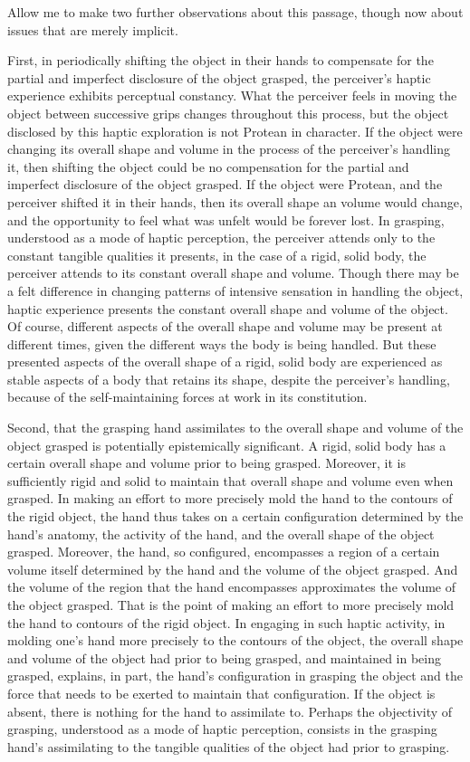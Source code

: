 \documentclass[12pt]{article}
\begin{document}
Allow me to make two further observations about this passage, though now about issues that are merely implicit.

First, in periodically shifting the object in their hands to compensate for the partial and imperfect disclosure of the object grasped, the perceiver's haptic experience exhibits perceptual constancy. What the perceiver feels in moving the object between successive grips changes throughout this process, but the object disclosed by this haptic exploration is not Protean in character. If the object were changing its overall shape and volume in the process of the perceiver's handling it, then shifting the object could be no compensation for the partial and imperfect disclosure of the object grasped. If the object were Protean, and the perceiver shifted it in their hands, then its overall shape an volume would change, and the opportunity to feel what was unfelt would be forever lost. In grasping, understood as a mode of haptic perception, the perceiver attends only to the constant tangible qualities it presents, in the case of a rigid, solid body, the perceiver attends to its constant overall shape and volume. Though there may be a felt difference in changing patterns of intensive sensation in handling the object, haptic experience presents the constant overall shape and volume of the object. Of course, different aspects of the overall shape and volume may be present at different times, given the different ways the body is being handled. But these presented aspects of the overall shape of a rigid, solid body are experienced as stable aspects of a body that retains its shape, despite the perceiver's handling, because of the self-maintaining forces at work in its constitution.

Second, that the grasping hand assimilates to the overall shape and volume of the object grasped is potentially epistemically significant. A rigid, solid body has a certain overall shape and volume prior to being grasped. Moreover, it is sufficiently rigid and solid to maintain that overall shape and volume even when grasped. In making an effort to more precisely mold the hand to the contours of the rigid object, the hand thus takes on a certain configuration determined by the hand's anatomy, the activity of the hand, and the overall shape of the object grasped. Moreover, the hand, so configured, encompasses a region of a certain volume itself determined by the hand and the volume of the object grasped. And the volume of the region that the hand encompasses approximates the volume of the object grasped. That is the point of making an effort to more precisely mold the hand to contours of the rigid object. In engaging in such haptic activity, in molding one's hand more precisely to the contours of the object, the overall shape and volume of the object had prior to being grasped, and maintained in being grasped, explains, in part, the hand's configuration in grasping the object and the force that needs to be exerted to maintain that configuration. If the object is absent, there is nothing for the hand to assimilate to. Perhaps the objectivity of grasping, understood as a mode of haptic perception, consists in the grasping hand's assimilating to the tangible qualities of the object had prior to grasping.
\end{document}
